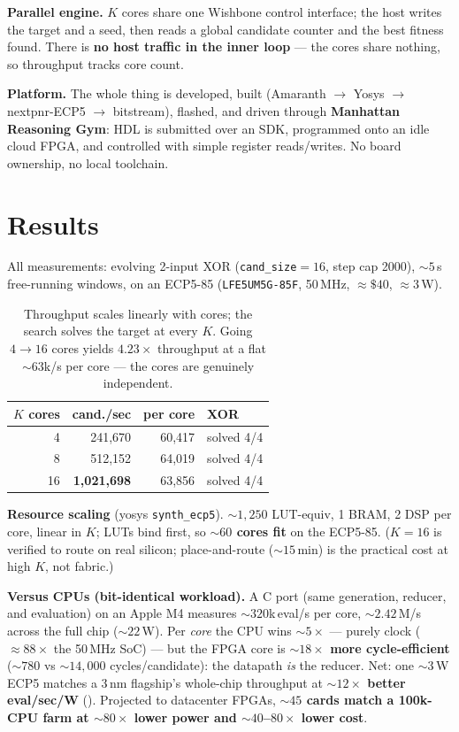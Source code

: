 \documentclass[letterpaper]{article}
\begin{document}
\textbf{Parallel engine.} $K$ cores share one Wishbone control interface; the
host writes the target and a seed, then reads a global candidate counter and
the best fitness found. There is \textbf{no host traffic in the inner loop} ---
the cores share nothing, so throughput tracks core count.

\textbf{Platform.} The whole thing is developed, built (Amaranth $\to$ Yosys
$\to$ nextpnr-ECP5 $\to$ bitstream), flashed, and driven through \textbf{Manhattan
Reasoning Gym}: HDL is submitted over an SDK, programmed onto an idle cloud
FPGA, and controlled with simple register reads/writes. No board ownership, no
local toolchain.

\section{Results}
All measurements: evolving 2-input XOR (\texttt{cand\_size}$=16$, step cap
2000), ${\sim}5$\,s free-running windows, on an ECP5-85
(\texttt{LFE5UM5G-85F}, 50\,MHz, ${\approx}\$40$, ${\approx}3$\,W).

\begin{table}[ht]
    \centering
    \begin{tabular}{rrrl}
        \toprule
        $K$ cores & cand./sec & per core & XOR \\
        \midrule
        4  & 241{,}670       & 60{,}417 & solved 4/4 \\
        8  & 512{,}152       & 64{,}019 & solved 4/4 \\
        16 & \textbf{1{,}021{,}698} & 63{,}856 & solved 4/4 \\
        \bottomrule
    \end{tabular}
    \caption{Throughput scales linearly with cores; the search solves the
    target at every $K$. Going $4\to16$ cores yields $4.23\times$ throughput at
    a flat ${\sim}63$k/s per core --- the cores are genuinely independent.}
    \label{tab:throughput}
\end{table}

\textbf{Resource scaling} (yosys \texttt{synth\_ecp5}). ${\sim}1{,}250$
LUT-equiv, 1 BRAM, 2 DSP per core, linear in $K$; LUTs bind first, so
\textbf{${\sim}60$ cores fit} on the ECP5-85. ($K=16$ is verified to route on
real silicon; place-and-route (${\sim}15$\,min) is the practical cost at high
$K$, not fabric.)

\textbf{Versus CPUs (bit-identical workload).} A C port (same generation,
reducer, and evaluation) on an Apple M4 measures ${\sim}320$k\,eval/s per core,
${\sim}2.42$\,M/s across the full chip (${\sim}22$\,W). Per \emph{core} the CPU
wins ${\sim}5\times$ --- purely clock (${\approx}88\times$ the 50\,MHz SoC) ---
but the FPGA core is \textbf{${\sim}18\times$ more cycle-efficient}
(${\sim}780$ vs ${\sim}14{,}000$ cycles/candidate): the datapath \emph{is} the
reducer. Net: one ${\sim}3$\,W ECP5 matches a 3\,nm flagship's whole-chip
throughput at \textbf{${\sim}12\times$ better eval/sec/W} ().
Projected to datacenter FPGAs, \textbf{${\sim}45$ cards match a 100k-CPU farm
at ${\sim}80\times$ lower power and ${\sim}40$--$80\times$ lower cost}.
\end{document}
